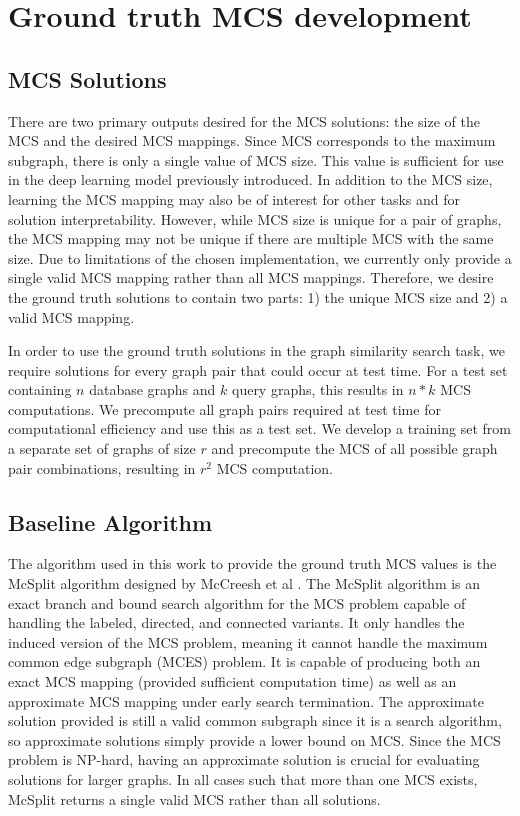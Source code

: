 \section{Ground truth MCS development}
\subsection{MCS Solutions}
There are two primary outputs desired for the MCS solutions: the size of the MCS and the desired MCS mappings. Since MCS corresponds to the maximum subgraph, there is only a single value of MCS size. This value is sufficient for use in the deep learning model previously introduced. In addition to the MCS size, learning the MCS mapping may also be of interest for other tasks and for solution interpretability. However, while MCS size is unique for a pair of graphs, the MCS mapping may not be unique if there are multiple MCS with the same size. Due to limitations of the chosen implementation, we currently only provide a single valid MCS mapping rather than all MCS mappings. Therefore, we desire the ground truth solutions to contain two parts: 1) the unique MCS size and 2) a valid MCS mapping.

In order to use the ground truth solutions in the graph similarity search task, we require solutions for every graph pair that could occur at test time. For a test set containing $n$ database graphs and $k$ query graphs, this results in $n*k$ MCS computations. We precompute all graph pairs required at test time for computational efficiency and use this as a test set. We develop a training set from a separate set of graphs of size $r$ and precompute the MCS of all possible graph pair combinations, resulting in $r^2$ MCS computation.

\subsection{Baseline Algorithm}
The algorithm used in this work to provide the ground truth MCS values is the McSplit algorithm designed by McCreesh et al \cite{mccreesh2017partitioning}. The McSplit algorithm is an exact branch and bound search algorithm for the MCS problem capable of handling the labeled, directed, and connected variants. It only handles the induced version of the MCS problem, meaning it cannot handle the maximum common edge subgraph (MCES) problem. It is capable of producing both an exact MCS mapping (provided sufficient computation time) as well as an approximate MCS mapping under early search termination. The approximate solution provided is still a valid common subgraph since it is a search algorithm, so approximate solutions simply provide a lower bound on MCS. Since the MCS problem is NP-hard, having an approximate solution is crucial for evaluating solutions for larger graphs. In all cases such that more than one MCS exists, McSplit returns a single valid MCS rather than all solutions.

